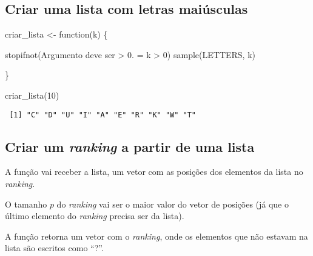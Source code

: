 \documentclass[
  letterpaper,
  DIV=11,
  numbers=noendperiod]{scrreprt}
\newenvironment{Shaded}{\begin{snugshade}}{\end{snugshade}}
\newcommand{\ControlFlowTok}[1]{\textcolor[rgb]{0.00,0.23,0.31}{#1}}
\newcommand{\DecValTok}[1]{\textcolor[rgb]{0.68,0.00,0.00}{#1}}
\newcommand{\FunctionTok}[1]{\textcolor[rgb]{0.28,0.35,0.67}{#1}}
\newcommand{\NormalTok}[1]{\textcolor[rgb]{0.00,0.23,0.31}{#1}}
\newcommand{\OtherTok}[1]{\textcolor[rgb]{0.00,0.23,0.31}{#1}}
\newcommand{\SpecialCharTok}[1]{\textcolor[rgb]{0.37,0.37,0.37}{#1}}
\newcommand{\StringTok}[1]{\textcolor[rgb]{0.13,0.47,0.30}{#1}}
\begin{document}
\subsection{Criar uma lista com letras
maiúsculas}\label{criar-uma-lista-com-letras-maiuxfasculas}

\begin{Shaded}
\begin{Highlighting}[]
\NormalTok{criar\_lista }\OtherTok{\textless{}{-}} \ControlFlowTok{function}\NormalTok{(k) \{}
  
  \FunctionTok{stopifnot}\NormalTok{(}\StringTok{\textquotesingle{}Argumento deve ser \textgreater{} 0.\textquotesingle{}} \OtherTok{=}\NormalTok{ k }\SpecialCharTok{\textgreater{}} \DecValTok{0}\NormalTok{)}
  \FunctionTok{sample}\NormalTok{(LETTERS, k)}
  
\NormalTok{\}}
\end{Highlighting}
\end{Shaded}

\begin{Shaded}
\begin{Highlighting}[]
\FunctionTok{criar\_lista}\NormalTok{(}\DecValTok{10}\NormalTok{)}
\end{Highlighting}
\end{Shaded}

\begin{verbatim}
 [1] "C" "D" "U" "I" "A" "E" "R" "K" "W" "T"
\end{verbatim}

\subsection{\texorpdfstring{Criar um \emph{ranking} a partir de uma
lista}{Criar um ranking a partir de uma lista}}\label{criar-um-ranking-a-partir-de-uma-lista}

A função vai receber a lista, um vetor com as posições dos elementos da
lista no \emph{ranking}.

O tamanho $p$ do \emph{ranking} vai ser o maior valor do vetor de
posições (já que o último elemento do \emph{ranking} precisa ser da
lista).

A função retorna um vetor com o \emph{ranking}, onde os elementos que
não estavam na lista são escritos como ``?''.
\end{document}
